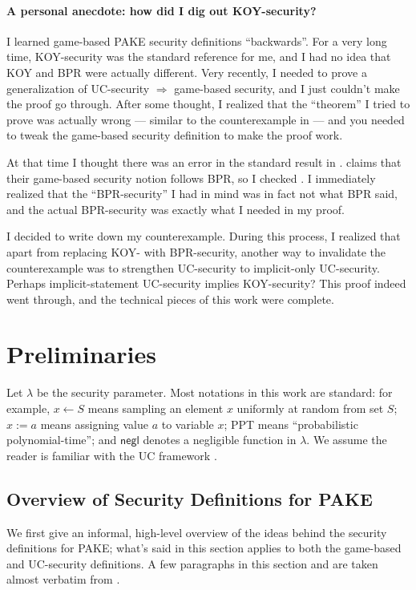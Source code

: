 \documentclass{article}
\newcommand{\negl}{\mathsf{negl}}
\begin{document}
\paragraph{A personal anecdote: how did I dig out KOY-security?}
I learned game-based PAKE security definitions ``backwards''. For a very long time, KOY-security was the standard reference for me, and I had no idea that KOY and BPR were actually different. Very recently, I needed to prove a generalization of UC-security $\Rightarrow$ game-based security, and I just couldn't make the proof go through. After some thought, I realized that the ``theorem'' I tried to prove was actually wrong --- similar to the counterexample in  --- and you needed to tweak the game-based security definition to make the proof work.

At that time I thought there was an error in the standard result in \cite{EC:CHKLM05}. \cite{EC:CHKLM05} claims that their game-based security notion follows BPR, so I checked \cite{EC:BelPoiRog00}. I immediately realized that the ``BPR-security'' I had in mind was in fact not what BPR said, and the actual BPR-security was exactly what I needed in my proof.

I decided to write down my counterexample. During this process, I realized that apart from replacing KOY- with BPR-security, another way to invalidate the counterexample was to strengthen UC-security to implicit-only UC-security. Perhaps implicit-statement UC-security implies KOY-security? This proof indeed went through, and the technical pieces of this work were complete.

\section{Preliminaries}
\label{sec:prelims}
Let $\lambda$ be the security parameter. Most notations in this work are standard: for example, $x \gets S$ means sampling an element $x$ uniformly at random from set $S$; $x := a$ means assigning value $a$ to variable $x$; PPT means ``probabilistic polynomial-time''; and $\negl$ denotes a negligible function in $\lambda$. We assume the reader is familiar with the UC framework \cite{FOCS:Canetti01}.
\subsection{Overview of Security Definitions for PAKE}
\label{sec:principles}
We first give an informal, high-level overview of the ideas behind the security definitions for PAKE; what's said in this section applies to both the game-based and UC-security definitions. A few paragraphs in this section and  are taken almost verbatim from \cite{EPRINT:Xu25}.
\end{document}
